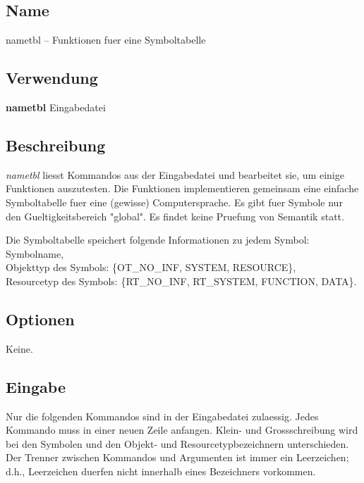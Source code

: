 
\subsection*{Name}

nametbl -- Funktionen fuer eine Symboltabelle 

\subsection*{Verwendung}

{\bf nametbl} Eingabedatei

\subsection*{Beschreibung}

{\it nametbl} liesst Kommandos aus der Eingabedatei und bearbeitet
sie, um einige Funktionen auszutesten.
Die Funktionen implementieren gemeinsam eine einfache Symboltabelle
fuer eine (gewisse) Computersprache. 
Es gibt fuer Symbole nur den Gueltigkeitsbereich "global". 
Es findet keine Pruefung von Semantik statt.

Die Symboltabelle speichert folgende Informationen zu jedem Symbol:\\
Symbolname,\\
Objekttyp des Symbols: \{OT\_NO\_INF, SYSTEM, RESOURCE\},\\
Resourcetyp des Symbols: \{RT\_NO\_INF, RT\_SYSTEM, FUNCTION, DATA\}.

\subsection*{Optionen}
Keine.

\subsection*{Eingabe}

Nur die folgenden Kommandos sind in der Eingabedatei zulaessig.
Jedes Kommando muss in einer neuen Zeile anfangen.
Klein- und Grossschreibung wird bei den Symbolen und den 
Objekt- und Resourcetypbezeichnern unterschieden.
Der Trenner zwischen Kommandos und Argumenten ist immer ein
Leerzeichen; d.h., Leerzeichen duerfen nicht innerhalb eines
Bezeichners vorkommen.

